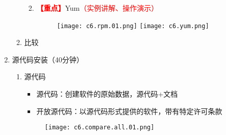 \documentclass{TIJMUjiaoanLL}
\begin{document}
\begin{enumerate}
\begin{enumerate}
\begin{enumerate}
\begin{itemize}
	    \vspace*{-10pt}
	    \end{itemize}
	  \item \textcolor{red}{\textbf{【重点】}}Yum\textcolor{red}{（实例讲解、操作演示）}
	    \vspace*{-10pt}
	    \begin{figure}[h]
	      \centering
	      \texttt{[image: c6.rpm.01.png]}
	      \texttt{[image: c6.yum.png]}
	    \end{figure}
	    \vspace*{-10pt}
	\end{enumerate}
      \item 比较
    \end{enumerate}

  \item 源代码安装（40分钟）
    \begin{enumerate}
      \item 源代码
	\begin{itemize}
	  \item 源代码：创建软件的原始数据，源代码+文档
	  \item 开放源代码：以源代码形式提供的软件，带有特定许可条款
	\end{itemize}


\otherTail
\newpage
\otherHeader


	    \vspace*{-10pt}
	    \begin{figure}[h]
	      \centering
	      \texttt{[image: c6.compare.all.01.png]}
	    \end{figure}
	    \vspace*{-10pt}


\end{enumerate}
\end{enumerate}
\end{document}

